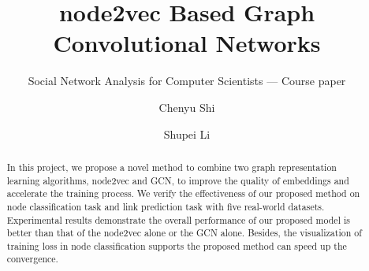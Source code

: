 \documentclass[sigconf]{acmart}
\begin{document}
\title{node2vec Based Graph Convolutional Networks}
\subtitle{ Social Network Analysis for Computer Scientists --- Course paper} %

\author{Chenyu Shi}

\author{Shupei Li}

\renewcommand{\shortauthors}{Shi and Li}


\begin{abstract}

In this project, we propose a novel method to combine two graph representation learning algorithms, node2vec and GCN, to improve the quality of embeddings and accelerate the training process. We verify the effectiveness of our proposed method on node classification task and link prediction task with five real-world datasets. Experimental results demonstrate the overall performance of our proposed model is better than that of the node2vec alone or the GCN alone. Besides, the visualization of training loss in node classification supports the proposed method can speed up the convergence.

\end{abstract}

\maketitle
\end{document}
